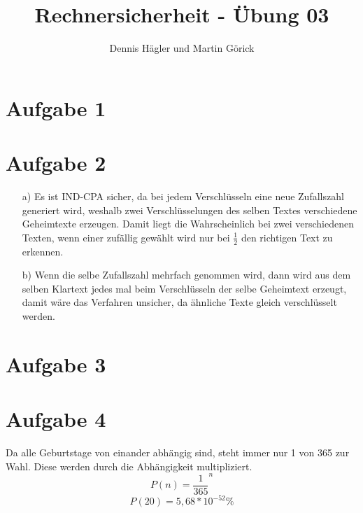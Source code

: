 \documentclass{scrartcl}
\title{Rechnersicherheit - Übung 03}
\author{Dennis Hägler und Martin Görick}
\begin{document}
\maketitle


\section{Aufgabe 1}

\section{Aufgabe 2}
\begin{itemize}
\item[a)] Es ist IND-CPA sicher, da bei jedem Verschlüsseln eine neue Zufallszahl generiert wird, weshalb zwei Verschlüsselungen des selben Textes verschiedene Geheimtexte erzeugen. Damit liegt die Wahrscheinlich bei zwei verschiedenen Texten, wenn einer zufällig gewählt wird nur bei $ \frac{1}{2}$ den richtigen Text zu erkennen.
\item[b)] Wenn die selbe Zufallszahl mehrfach genommen wird, dann wird aus dem selben Klartext jedes mal beim Verschlüsseln der selbe Geheimtext erzeugt, damit wäre das Verfahren unsicher, da ähnliche Texte gleich verschlüsselt werden.
\end{itemize}

\section{Aufgabe 3}

\section{Aufgabe 4}
Da alle Geburtstage von einander abhängig sind, steht immer nur 1 von 365  zur Wahl. Diese werden durch die Abhängigkeit multipliziert.
$$ P(n) = \frac{1}{365}^{n}$$
$$ P(20) = 5,68 * 10^{-52} \% $$
\end{document}

